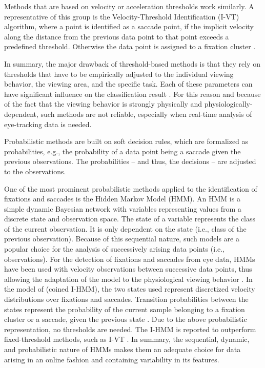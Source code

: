 \documentclass[preprint,12pt]{elsarticle}
\begin{document}
Methods that are based on velocity or acceleration thresholds work similarly.
A representative of this group is the Velocity-Threshold Identification (I-VT) algorithm,
where a point is identified as a saccade point,
if the implicit velocity along the distance from the previous data point to that point exceeds a predefined threshold.
Otherwise the data point is assigned to a fixation cluster \cite{Salvucci:2000:IFS:355017.355028}.

In summary, the major drawback of threshold-based methods is that they rely on thresholds that have to be empirically adjusted to the individual viewing behavior,
the viewing area, and the specific task.
Each of these parameters can have significant influence on the classification result \cite{Komogortsev2013, Salvucci:2000:IFS:355017.355028}.
For this reason and because of the fact that the viewing behavior is strongly physically and physiologically-dependent, such methods are not reliable, especially when real-time analysis of eye-tracking data is needed.

Probabilistic methods are built on soft decision rules, which are formalized as probabilities, e.g.,  the probability of a data point being a saccade given the previous observations. The probabilities – and thus, the decisions – are adjusted to the observations.

One of the most prominent probabilistic methods applied to the identification of fixations and saccades is the Hidden Markov Model (HMM).
An HMM is a simple dynamic Bayesian network with variables representing values from a discrete state and observation space.
The state of a variable represents the class of the current observation. It is only dependent on the state (i.e., class of the previous observation).
Because of this sequential nature, such models are a popular choice for the analysis of successively arising data points (i.e., observations).
For the detection of fixations and saccades from eye data, HMMs have been used with velocity observations between successive data points,
thus allowing the adaptation of the model to the physiological viewing behavior \cite{Salvucci:2000:IFS:355017.355028}.
In the model of \cite{Salvucci:2000:IFS:355017.355028} (coined I-HMM),
the two states used represent discretized velocity distributions over fixations and saccades.
Transition probabilities between the states represent the probability of the current sample belonging to a fixation cluster or a saccade,
given the previous state \cite{holmqvist-eye-tracking-a-comprehensive-guide-to-methods-and-measures}.
Due to the above probabilistic representation, no thresholds are needed.
The I-HMM is reported to outperform fixed-threshold methods,
such as I-VT \cite{Salvucci:2000:IFS:355017.355028}.
In summary, the sequential, dynamic,
and probabilistic nature of HMMs makes them an adequate choice for data arising in an online fashion and containing variability in its features.
\end{document}
